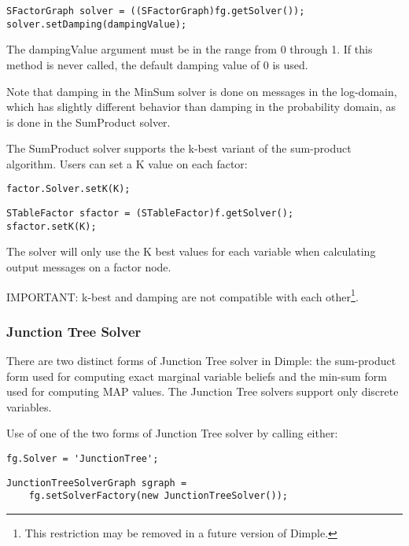 \ifjava
\begin{lstlisting}
SFactorGraph solver = ((SFactorGraph)fg.getSolver());
solver.setDamping(dampingValue);
\end{lstlisting}
\fi


The dampingValue argument must be in the range from 0 through 1.  If this method is never called, the default damping value of 0 is used.

Note that damping in the MinSum solver is done on messages in the log-domain, which has slightly different behavior than damping in the probability domain, as is done in the SumProduct solver.



The SumProduct solver supports the k-best variant of the sum-product algorithm.  Users can set a K value on each factor:

\ifmatlab
\begin{lstlisting}
factor.Solver.setK(K);
\end{lstlisting}
\fi

\ifjava
\begin{lstlisting}
STableFactor sfactor = (STableFactor)f.getSolver();
sfactor.setK(K);
\end{lstlisting}
\fi

The solver will only use the K best values for each variable when calculating output messages on a factor node.

IMPORTANT: k-best and damping are not compatible with each other\footnote{This restriction may be removed in a future version of Dimple.}.

\subsubsection{Junction Tree Solver}
\label{sec:JunctionTreeSolverAPI}

There are two distinct forms of Junction Tree solver in Dimple: the sum-product form used for computing exact marginal variable beliefs and the min-sum form used for computing MAP values.  The Junction Tree solvers support only discrete variables.

Use of one of the two forms of Junction Tree solver by calling either:

\ifmatlab
\begin{lstlisting}
fg.Solver = 'JunctionTree';
\end{lstlisting}
\fi

\ifjava
\begin{lstlisting}
JunctionTreeSolverGraph sgraph =
    fg.setSolverFactory(new JunctionTreeSolver());
\end{lstlisting}
\fi

